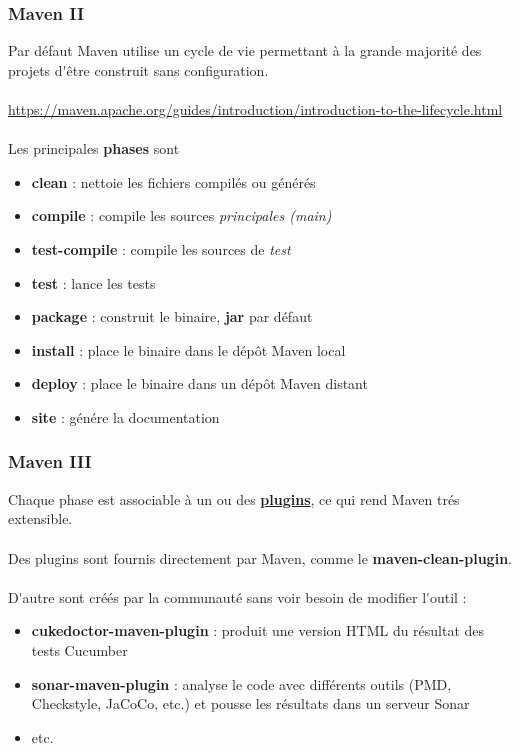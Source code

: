 \begin{frame}
	\frametitle{Maven II}
    Par d\'{e}faut Maven utilise un cycle de vie permettant \`{a} la grande majorit\'{e} des projets d\'{}\^{e}tre construit sans configuration.
    \\~\\
    \url{https://maven.apache.org/guides/introduction/introduction-to-the-lifecycle.html}
    \\~\\
    Les principales \textbf{phases} sont
    \begin{itemize}
      \item \textbf{clean} : nettoie les fichiers compil\'{e}s ou g\'{e}n\'{e}r\'{e}s
      \item \textbf{compile} : compile les sources \textit{principales (main)}
      \item \textbf{test-compile} : compile les sources de \textit{test}
      \item \textbf{test} : lance les tests
      \item \textbf{package} : construit le binaire, \textbf{jar} par d\'{e}faut
      \item \textbf{install} : place le binaire dans le d\'{e}p\^{o}t Maven local
      \item \textbf{deploy} : place le binaire dans un d\'{e}p\^{o}t Maven distant
      \item \textbf{site} : g\'{e}n\'{e}re la documentation
    \end{itemize}
\end{frame}

\begin{frame}
	\frametitle{Maven III}
    Chaque phase est associable \`{a} un ou des \underline{\textbf{plugins}}, ce qui rend Maven tr\'{e}s extensible.
    \\~\\
    Des plugins sont fournis directement par Maven, comme le \textbf{maven-clean-plugin}.
    \\~\\
    D\'{}autre sont cr\'{e}\'{e}s par la communaut\'{e} sans voir besoin de modifier l\'{}outil :
    \begin{itemize}
      \item \textbf{cukedoctor-maven-plugin} : produit une version HTML du r\'{e}sultat des tests Cucumber
      \item \textbf{sonar-maven-plugin} : analyse le code avec diff\'{e}rents outils (PMD, Checkstyle, JaCoCo, etc.) et pousse les r\'{e}sultats dans un serveur Sonar
      \item etc.
    \end{itemize}
\end{frame}


